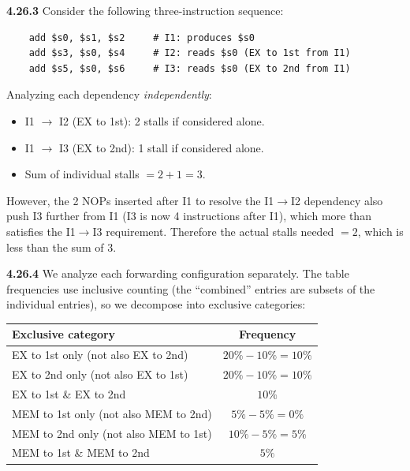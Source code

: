 \medskip\noindent\textbf{4.26.3}
Consider the following three-instruction sequence:
\begin{verbatim}
    add $s0, $s1, $s2     # I1: produces $s0
    add $s3, $s0, $s4     # I2: reads $s0 (EX to 1st from I1)
    add $s5, $s0, $s6     # I3: reads $s0 (EX to 2nd from I1)
\end{verbatim}

Analyzing each dependency \emph{independently}:
\begin{itemize}
  \item I1 $\to$ I2 (EX to 1st): 2 stalls if considered alone.
  \item I1 $\to$ I3 (EX to 2nd): 1 stall if considered alone.
  \item Sum of individual stalls $= 2 + 1 = 3$.
\end{itemize}

However, the 2 NOPs inserted after I1 to resolve the I1$\to$I2 dependency also
push I3 further from I1 (I3 is now 4 instructions after I1), which more than
satisfies the I1$\to$I3 requirement. Therefore the actual stalls needed $= 2$,
which is less than the sum of $3$.

\medskip\noindent\textbf{4.26.4}
We analyze each forwarding configuration separately. The table frequencies use
inclusive counting (the ``combined'' entries are subsets of the individual
entries), so we decompose into exclusive categories:

\begin{center}
\begin{tabular}{lc}
\toprule
\textbf{Exclusive category} & \textbf{Frequency} \\
\midrule
EX to 1st only (not also EX to 2nd)       & $20\% - 10\% = 10\%$ \\
EX to 2nd only (not also EX to 1st)       & $20\% - 10\% = 10\%$ \\
EX to 1st \& EX to 2nd                    & $10\%$ \\
MEM to 1st only (not also MEM to 2nd)     & $5\% - 5\% = 0\%$ \\
MEM to 2nd only (not also MEM to 1st)     & $10\% - 5\% = 5\%$ \\
MEM to 1st \& MEM to 2nd                  & $5\%$ \\
\bottomrule
\end{tabular}
\end{center}

